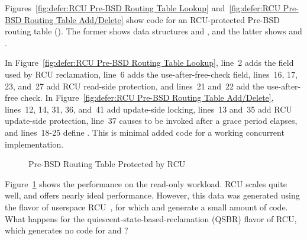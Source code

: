 Figures~\ref{fig:defer:RCU Pre-BSD Routing Table Lookup}
and~\ref{fig:defer:RCU Pre-BSD Routing Table Add/Delete}
show code for an RCU-protected Pre-BSD routing table
().
The former shows data structures and ,
and the latter shows  and .

In Figure~\ref{fig:defer:RCU Pre-BSD Routing Table Lookup},
line~2 adds the  field used by RCU reclamation,
line~6 adds the  use-after-free-check field,
lines~16, 17, 23, and~27 add RCU read-side protection,
and lines~21 and~22 add the use-after-free check.
In Figure~\ref{fig:defer:RCU Pre-BSD Routing Table Add/Delete},
lines~12, 14, 31, 36, and~41 add update-side locking,
lines~13 and~35 add RCU update-side protection,
line~37 causes  to be invoked after a grace period elapses,
and lines~18-25 define .
This is minimal added code for a working concurrent implementation.

\begin{figure}[tb]
\centering
{}
\caption{Pre-BSD Routing Table Protected by RCU}
\label{fig:defer:Pre-BSD Routing Table Protected by RCU}
\end{figure}

Figure~\ref{fig:defer:Pre-BSD Routing Table Protected by RCU}
shows the performance on the read-only workload.
RCU scales quite well, and offers nearly ideal performance.
However, this data was generated using the 
flavor of userspace
RCU~\cite{MathieuDesnoyers2009URCU,PaulMcKenney2013LWNURCU},
for which  and 
generate a small amount of code.
What happens for the quiescent-state-based-reclamation (QSBR)
flavor of RCU, which generates no code for
 and ?

